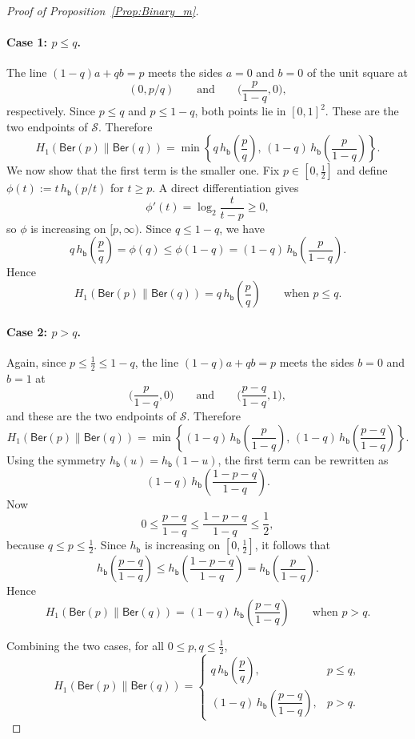 \documentclass[10pt,a4paper]{amsart}
\newcommand{\Ber}{\mathsf{Ber}}
\begin{document}
\begin{proof}[Proof of Proposition~\ref{Prop:Binary_m}]
\paragraph{Case 1: $p\le q$.}
The line \((1-q)a+qb=p\) meets the sides $a=0$ and $b=0$ of the unit square at
\[(0,p/q) \qquad\text{and}\qquad\Big(\frac{p}{1-q},0\Big),\]
respectively. Since $p\le q$ and $p\le 1-q$, both points lie in $[0,1]^2$. These are the two endpoints of $\mathcal S$. Therefore
\[H_1(\Ber(p)\|\Ber(q))
=\min\left\{
q\,h_{\mathsf{b}}\!\left(\frac{p}{q}\right),
\,(1-q)\,h_{\mathsf{b}}\!\left(\frac{p}{1-q}\right)
\right\}.\]
We now show that the first term is the smaller one. Fix $p\in[0,\frac12]$ and define \(\phi(t):=t\,h_{\mathsf{b}}(p/t)\) for $t\ge p$.
A direct differentiation gives
\[\phi'(t)=\log_2\!\frac{t}{t-p}\ge 0,\]
so $\phi$ is increasing on $[p,\infty)$. Since $q\le 1-q$, we have 
\[q\,h_{\mathsf{b}}\!\left(\frac{p}{q}\right) =\phi(q)\le\phi(1-q)=(1-q)\,h_{\mathsf{b}}\!\left(\frac{p}{1-q}\right).\]
Hence
\[H_1(\Ber(p)\|\Ber(q))=q\,h_{\mathsf{b}}\!\left(\frac{p}{q}\right)
\qquad\text{when } p\le q.\]

\paragraph{Case 2: $p>q$.}
Again, since $p\le \frac12\le 1-q$, the line \((1-q)a+qb=p\)
meets the sides $b=0$ and $b=1$ at \[
\Big(\frac{p}{1-q},0\Big) \qquad\text{and}\qquad \Big(\frac{p-q}{1-q},1\Big),\]
and these are the two endpoints of $\mathcal S$. Therefore
\[H_1(\Ber(p)\|\Ber(q))=\min\left\{
(1-q)\,h_{\mathsf{b}}\!\left(\frac{p}{1-q}\right),\,(1-q)\,h_{\mathsf{b}}\!\left(\frac{p-q}{1-q}\right)\right\}.\]
Using the symmetry $h_{\mathsf{b}}(u)=h_{\mathsf{b}}(1-u)$, the first term can be rewritten as
\[
(1-q)\,h_{\mathsf{b}}\!\left(\frac{1-p-q}{1-q}\right).
\]
Now
\[
0\le \frac{p-q}{1-q}\le \frac{1-p-q}{1-q}\le \frac12,
\]
because $q\le p\le \frac12$. Since $h_{\mathsf{b}}$ is increasing on $[0,\frac12]$, it follows that
\[
h_{\mathsf{b}}\!\left(\frac{p-q}{1-q}\right)
\le
h_{\mathsf{b}}\!\left(\frac{1-p-q}{1-q}\right)
=
h_{\mathsf{b}}\!\left(\frac{p}{1-q}\right).
\]
Hence
\[
H_1(\Ber(p)\|\Ber(q))
=
(1-q)\,h_{\mathsf{b}}\!\left(\frac{p-q}{1-q}\right)
\qquad\text{when } p>q.
\]

Combining the two cases, for all $0\le p,q\le \frac12$,
\[
H_1(\Ber(p)\|\Ber(q))
=
\begin{cases}
q\,h_{\mathsf{b}}\!\left(\dfrac{p}{q}\right), & p\le q,\\[1.2ex]
(1-q)\,h_{\mathsf{b}}\!\left(\dfrac{p-q}{1-q}\right), & p>q.
\end{cases}
\]
\end{proof}
\end{document}
